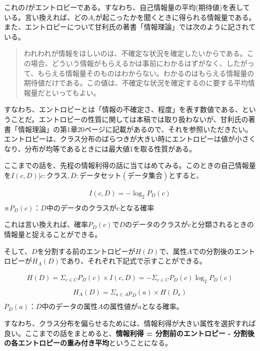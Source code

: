 \documentclass[dvipdfmx]{jsarticle}
\begin{document}
これの$I$がエントロピーである。すなわち、自己情報量の平均(期待値)を表している。言い換えれば、どの$A_{i}$が起こったかを聞くときに得られる情報量である。
また、エントロピーについて甘利氏の著書「情報理論」\cite{amari01}では次のように記されている。
\begin{quote}
  われわれが情報をほしいのは、不確定な状況を確定したいからである。この場合、どういう情報がもらえるかは事前にわかるはずがなく、したがって、もらえる情報量そのものはわからない。わかるのはもらえる情報量の期待値だけである。この値は、不確定な状況を確定するのに要する平均情報量だといってもよい。
\end{quote}
すなわち、エントロピーとは「情報の不確定さ、程度」を表す数値である、ということだ。エントロピーの性質に関しては本稿では取り扱わないが、甘利氏の著書「情報理論」\cite{amari01}の第1章20ページに記載があるので、それを参照いただきたい。エントロピーは、クラス分布のばらつきが大きい時にエントロピーは値が小さくなり、分布が均等であるときには最大値1を取る性質がある。\par
ここまでの話を、先程の情報利得の話に当てはめてみる。このときの自己情報量を$I(c, D)|c:クラス, D:データセット(データ集合)$とすると、
\begin{center}
  \begin{align*}
    I(c, D) = -\log_2 P_{D}(c) \\
  \end{align*}
  ※$P_{D}(c)$：$D$中のデータのクラスが$c$となる確率
\end{center}
これは言い換えれば、確率$P_{D}(c)$で$D$のデータのクラスが$c$と分類されるときの情報量と捉えることができる。\par
そして、$D$を分割する前のエントロピーが$H(D)$で、属性$A$での分割後のエントロピーが$H_{A}(D)$であり、それぞれ下記式で示すことができる。
\newpage
\begin{center}
  \begin{align*}
    H(D)=\Sigma_{c \in C}P_{D}(c) \times I(c, D)=-\Sigma_{c \in C}P_{D}(c)\log_2 P_{D}(c) \\
  \end{align*}
  \begin{align*}
    H_{A}(D)=\Sigma_{a \in A}p_{D}(a) \times H(D_{a}) \\
  \end{align*}
  $P_{D}(a)$：$D$中のデータの属性$A$の属性値が$a$となる確率。
\end{center}
すなわち、クラス分布を偏らせるためには、情報利得が大きい属性を選択すれば良い。ここまでの話をまとめると、\textbf{情報利得 = 分割前のエントロピー - 分割後の各エントロピーの重み付き平均}ということになる。
\end{document}
